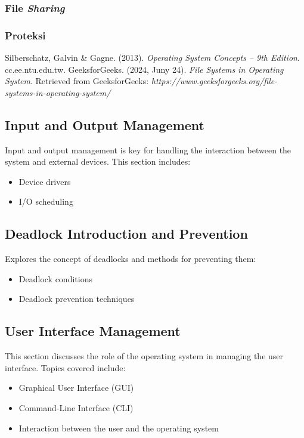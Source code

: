 \documentclass[12pt]{article}
\begin{document}
    \subsubsection{File \textit{Sharing}}
    \subsubsection{Proteksi}
    \begin{thebibliography}{99}
        Silberschatz, Galvin \& Gagne. (2013). \textit{Operating System Concepts – 9th Edition}. cc.ee.ntu.edu.tw.
        GeeksforGeeks. (2024, Juny 24). \textit{File Systems in Operating System}. Retrieved from GeeksforGeeks: \textit{https://www.geeksforgeeks.org/file-systems-in-operating-system/}
    \end{thebibliography}

\subsection{Input and Output Management}
Input and output management is key for handling the interaction between the system and external devices. This section includes:
\begin{itemize}
    \item Device drivers
    \item I/O scheduling
\end{itemize}

\subsection{Deadlock Introduction and Prevention}
Explores the concept of deadlocks and methods for preventing them:
\begin{itemize}
    \item Deadlock conditions
    \item Deadlock prevention techniques
\end{itemize}

\subsection{User Interface Management}
This section discusses the role of the operating system in managing the user interface. Topics covered include:
\begin{itemize}
    \item Graphical User Interface (GUI)
    \item Command-Line Interface (CLI)
    \item Interaction between the user and the operating system
\end{itemize}
\end{document}
